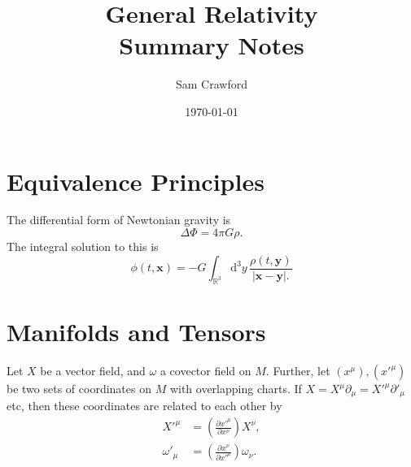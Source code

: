 \documentclass[12pt]{article}
\title{General Relativity\\
\Large{Summary Notes}}
\author{Sam Crawford}
\date{\today}
\begin{document}
\maketitle

\tableofcontents

\pagebreak

\section{Equivalence Principles}

\begin{noteEquation}
	The differential form of Newtonian gravity is
		\begin{equation}
			\Delta \Phi = 4 \pi G \rho.
		\end{equation}
	The integral solution to this is
		\begin{equation}
			\phi(t,\mathbf{x}) = - G \int_{\mathbb{R}^3} \mathrm{d}^3y \, \frac{
				\rho(t,\mathbf{y})
			}{
				| \mathbf{x} - \mathbf{y}|.
			}
		\end{equation}
\end{noteEquation}

\section{Manifolds and Tensors}

\begin{prop}\label{prop:trans1}
	Let $X$ be a vector field, and $\omega$ a covector field on $M$. Further, let $(x^\mu), (x'^\mu)$ be two sets of coordinates on $M$ with overlapping charts. If $X = X^\mu \partial_\mu = X'^\mu \partial'_\mu$ etc, then these coordinates are related to each other by
		\begin{subequations}\begin{align}
			X'^\mu &= \left( \frac{\partial x'^\mu }{\partial x^\nu} \right) X^\nu, \\
			\omega'_\mu &= \left( \frac{\partial x^\nu}{\partial x'^\mu} \right) \omega_\nu.
		\end{align}\end{subequations}
\end{prop}
\end{document}
